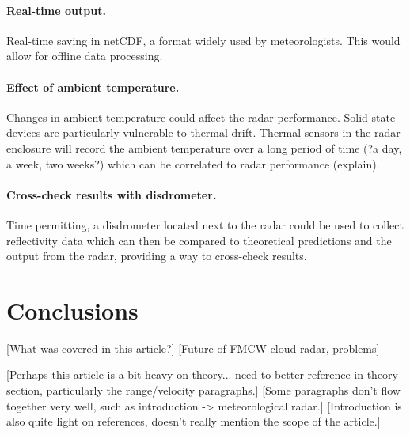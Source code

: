 \documentclass{article}
\begin{document}
\paragraph{Real-time output.} Real-time saving in netCDF,\supercite{NetCDFFormat} a format widely used by meteorologists. This would allow for offline data processing.
\paragraph{Effect of ambient temperature.} Changes in ambient temperature could affect the radar performance. Solid-state devices are particularly vulnerable to thermal drift. Thermal sensors in the radar enclosure will record the ambient temperature over a long period of time (?a day, a week, two weeks?) which can be correlated to radar performance (explain).
\paragraph{Cross-check results with disdrometer.} Time permitting, a disdrometer located next to the radar could be used to collect reflectivity data which can then be compared to theoretical predictions and the output from the radar, providing a way to cross-check results.

\section{Conclusions}
[What was covered in this article?]
[Future of FMCW cloud radar, problems]

[Perhaps this article is a bit heavy on theory... need to better reference in theory section, particularly the range/velocity paragraphs.]
[Some paragraphs don't flow together very well, such as introduction -> meteorological radar.]
[Introduction is also quite light on references, doesn't really mention the scope of the article.]

\nocite{*}
\printbibliography
\end{document}
